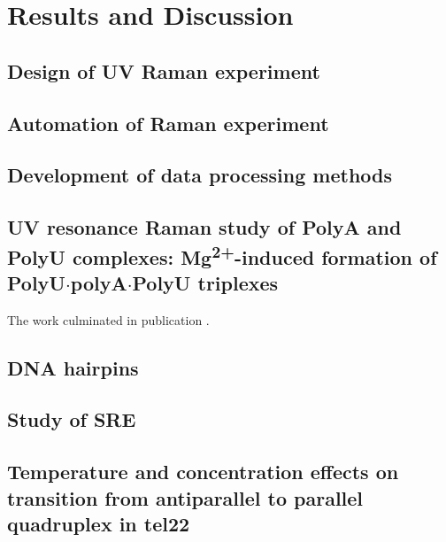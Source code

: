 \chapter{Results and Discussion}

\section{Design of UV Raman experiment}

\section{Automation of Raman experiment}

\section{Development of data processing methods}

\section[\texorpdfstring{%
    UV resonance Raman study of PolyA and PolyU complexes:\\
		Mg\textsuperscript{2+}\babelhyphen{nobreak}induced formation of
		PolyU$\cdot$polyA$\cdot$PolyU triplexes
}{%
    UV resonance Raman study of PolyA and PolyU complexes:
		Mg\texttwosuperior\textplussuperior-induced formation of PolyU·polyA·PolyU
		triplexes
}]{%
    UV resonance Raman study of PolyA and PolyU complexes:
		Mg\textsuperscript{2+}-induced formation of PolyU$\cdot$polyA$\cdot$PolyU
		triplexes
}%

The work culminated in publication \textcite{Klener2015}.

\section{DNA hairpins}

\section{Study of SRE}

\section[Temperature and concentration effects on transition from antiparallel to parallel quadruplex in tel22]{Temperature and concentration effects on transition from antiparallel to parallel\\ quadruplex in tel22}

